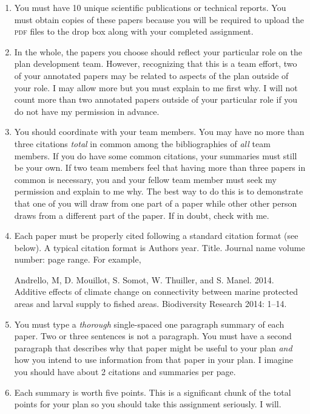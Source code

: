 \documentclass[12pt]{article}
\begin{document}
\begin{enumerate}[leftmargin=*]

\item You must have 10 unique scientific publications or technical reports. You must obtain copies of these papers because you will be required to upload the \textsc{pdf} files to the drop box along with your completed assignment.

\item In the whole, the papers you choose should reflect your particular role on the plan development team. However, recognizing that this is a team effort, two of your annotated papers may be related to aspects of the plan outside of your role. I may allow more but you must explain to me first why. I will not count more than two annotated papers outside of your particular role if you do not have my permission in advance.

\item You should coordinate with your team members. You may have no more than three citations \emph{total} in common among the bibliographies of \emph{all} team members. If you do have some common citations, your summaries must still be your own. If two team members feel that having more than three papers in common is necessary, you and your fellow team member must seek my permission and explain to me why. The best way to do this is to demonstrate that one of you will draw from one part of a paper while other other person draws from a different part of the paper. If in doubt, check with me.

\item Each paper must be properly cited following a standard citation format (see below).  A typical citation format is Authors year. Title. Journal name volume number: page range. For example,

Andrello, M, D. Mouillot, S. Somot, W. Thuiller, and S. Manel. 2014. Additive effects  of climate change on connectivity between marine protected areas and larval supply to fished areas. Biodiversity Research 2014: 1–14.

\item You must type a \emph{thorough} single-spaced one paragraph summary of each paper. Two or three sentences is not a paragraph. You must have a second paragraph that describes why that paper might be useful to your plan \emph{and} how you intend to use information from that paper in your plan. I imagine you should have about 2 citations and summaries per page. 

\item Each summary is worth five points. This is a significant chunk of the total points for your plan so you should take this assignment seriously. I will.

\end{enumerate}
\end{document}
